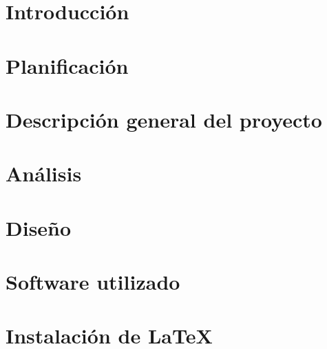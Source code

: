 \documentclass[a4paper,11pt]{book}
\begin{document}
\renewcommand{\figurename}{Figura}
\renewcommand{\listfigurename}{Indice de figuras}
\renewcommand{\tablename}{Tabla}
\renewcommand{\listtablename}{Indice de tablas}

\pagestyle{empty}

\cleardoublepage


\cleardoublepage
\pagestyle{plain}

\frontmatter %


\cleardoublepage

\tableofcontents
\listoffigures
\listoftables

\mainmatter %

\chapter{Introducción}

\chapter{Planificación}

\chapter{Descripción general del proyecto}

\chapter{Análisis}

\chapter{Diseño}

%

\backmatter %


\clearpage
{}




\chapter*{Software utilizado}


\chapter*{Instalación de \LaTeX}



\end{document}
